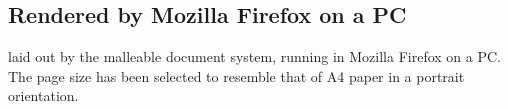 \newlength{\imgwid}

\subsection{Rendered by Mozilla Firefox on a PC}
\label{app:layout-ff}

\cite{Pinkney2011} laid out by the malleable document system, running in Mozilla Firefox on a PC. The page size has been selected to resemble that of A4 paper in a portrait orientation.

\begin{center}
\setlength{\imgwid}{0.47\textwidth}
\hspace{0.01\textwidth}

\end{center}
